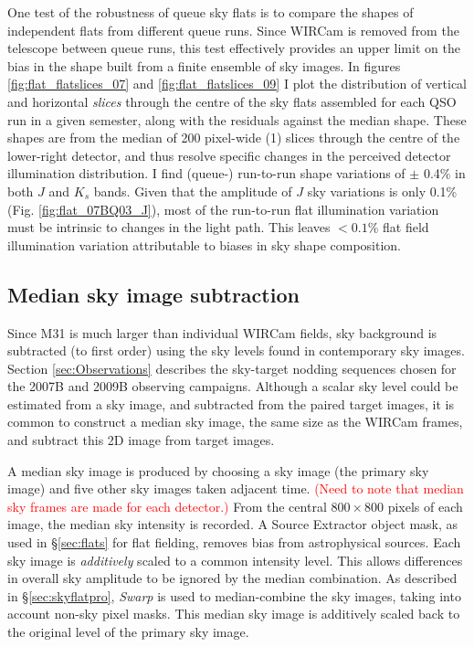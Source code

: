\documentclass[iop]{emulateapj}
\newcommand{\sw}[1]{\textit{#1}} %
\newcommand{\changeit}[1]{\textcolor{red}{#1}} %
\begin{document}
One test of the robustness of queue sky flats is to compare the shapes of independent flats from different queue runs. Since WIRCam is removed from the telescope between queue runs, this test effectively provides an upper limit on the bias in the shape built from a finite ensemble of sky images. In figures \ref{fig:flat_flatslices_07} and \ref{fig:flat_flatslices_09} I plot the distribution of vertical and horizontal \emph{slices} through the centre of the sky flats assembled for each QSO run in a given semester, along with the residuals against the median shape. These shapes are from the median of 200 pixel-wide (1\arcmin) slices through the centre of the lower-right detector, and thus resolve specific changes in the perceived detector illumination distribution. I find (queue-) run-to-run shape variations of $\pm$ 0.4\% in both $J$ and $K_s$ bands. Given that the amplitude of $J$ sky variations is only 0.1\% (Fig. \ref{fig:flat_07BQ03_J}), most of the run-to-run flat illumination variation must be intrinsic to changes in the light path. This leaves $<0.1$\% flat field illumination variation attributable to biases in sky shape composition.

\subsection{Median sky image subtraction} %
\label{sec:mediansky}

Since M31 is much larger than individual WIRCam fields, sky background is subtracted (to first order) using the sky levels found in contemporary sky images. Section \ref{sec:Observations} describes the sky-target nodding sequences chosen for the 2007B and 2009B observing campaigns. Although a scalar sky level could be estimated from a sky image, and subtracted from the paired target images, it is common to construct a median sky image, the same size as the WIRCam frames, and subtract this 2D image from target images.

A median sky image is produced by choosing a sky image (the primary sky image) and five other sky images taken adjacent time. \changeit{(Need to note that median sky frames are made for each detector.)} From the central $800\times 800$ pixels of each image, the median sky intensity is recorded. A Source Extractor object mask, as used in \S \ref{sec:flats} for flat fielding, removes bias from astrophysical sources. Each sky image is \emph{additively} scaled to a common intensity level. This allows differences in overall sky amplitude to be ignored by the median combination. As described in \S \ref{sec:skyflatpro}, \sw{Swarp} is used to median-combine the sky images, taking into account non-sky pixel masks. This median sky image is additively scaled back to the original level of the primary sky image.
\end{document}
